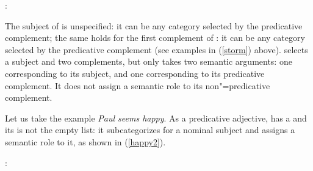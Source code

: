 \eas
{}:\\
\zs

	
The subject of  is unspecified: it can be any category selected by the predicative
complement; the same holds for the first complement of :
it can be any category
selected by the predicative complement (see examples in (\ref{storm}) above).   selects
a subject and two complements, but only takes two semantic arguments: one corresponding to its
subject, and one corresponding to its predicative complement. It does not assign a semantic role to
its non"=predicative complement.

Let us take the example \textit{Paul seems happy}. As a predicative adjective,  has a
\headf [\prd $+$] and its \subjf is not the empty list: it subcategorizes for a nominal subject and
assigns a semantic role to it, as shown in (\ref{happy2}).
	
\eas
\label{happy2}%
:\\
\zs


